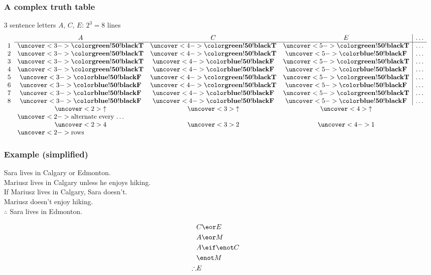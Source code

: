 \begin{frame}
  \frametitle{A complex truth table}
  
  3 sentence letters $A$, $C$, $E$: $2^3 = 8$ lines
  \footnotesize
    \[\begin{array}{lccc|c}
    & A & C & E & \dots\\
     \cline{2-5}
    1 & \uncover<3->{\True} & \uncover<4->{\True} &
     \uncover<5->{\True} & \dots \\
    2 & \uncover<3->{\True} & \uncover<4->{\True} &
     \uncover<5->{\False} & \dots \\
    3 & \uncover<3->{\True} & \uncover<4->{\False} &
     \uncover<5->{\True} & \dots \\
    4 & \uncover<3->{\True} & \uncover<4->{\False} &
     \uncover<5->{\False} & \dots \\
    5 & \uncover<3->{\False} & \uncover<4->{\True} &
    \uncover<5->{\True} & \dots \\
    6 & \uncover<3->{\False} & \uncover<4->{\True} &
    \uncover<5->{\False} & \dots \\
    7 & \uncover<3->{\False} & \uncover<4->{\False} &
    \uncover<5->{\True} & \dots \\
    8 & \uncover<3->{\False} & \uncover<4->{\False} &
    \uncover<5->{\False} & \dots \\
    & \uncover<2>{\uparrow} &\uncover<3>{\uparrow} & \multicolumn{1}{c}{\uncover<4>{\uparrow}}\\
    & \multicolumn{4}{l}{\uncover<2->{\text{alternate every \dots}}} \\
    & \uncover<2>{4} & \uncover<3>{2} & \multicolumn{1}{c}{\uncover<4->{1}} \\
    & \multicolumn{4}{l}{\uncover<2->{\text{rows}}} \\
    \end{array}\]
  \end{frame}
  
\begin{frame}
  \frametitle{Example (simplified)}

  Sara lives in Calgary or Edmonton.\\
  Mariusz lives in Calgary unless he enjoys hiking.\\
  If Mariusz lives in Calgary, Sara doesn't.\\
  Mariusz doesn't enjoy hiking.\\
  $\therefore$ Sara lives in Edmonton.

  \begin{align*}
  & C \eor E\\
  & A \eor M\\
  & A \eif \enot C\\
  &\enot M\\
  \therefore & E
  \end{align*}
\end{frame}

